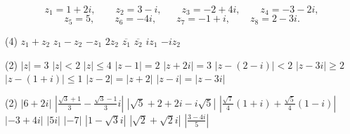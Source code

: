 \documentclass[12pt,a4paper]{article}
\begin{document}
\setcounter{section}{2}

\begin{exercise}
        \[
            z_1=1+2i,\qquad
            z_2=3-i,\qquad
            z_3=-2+4i,\qquad
            z_4=-3-2i,
        \]
        \[
            z_5=5,\qquad
            z_6=-4i,\qquad
            z_7=-1+i,\qquad
            z_8=2-3i.
        \]
\end{exercise}


\begin{exercise}[Pro čísla $z_1=1+2i$ a $z_2=3-i$ nejprve určete algebraicky a poté graficky znázorněte obrazy čísel]
        \begin{tasks}(4)
            \task $z_1+z_2$
            \task $z_1-z_2$
            \task $-z_1$
            \task $2z_2$
            \task $\overline{z_1}$
            \task $\overline{z_2}$
            \task $iz_1$
            \task $-iz_2$
        \end{tasks}
\end{exercise}


\begin{exercise}
        \begin{tasks}(2)
            \task $|z|=3$
            \task $|z|<2$
            \task $|z|\leq4$
            \task $|z-1|=2$
            \task $|z+2i|=3$
            \task $|z-(2-i)|<2$
            \task $|z-3i|\geq2$
            \task $|z-(1+i)|\leq1$
            \task $|z-2|=|z+2|$
            \task $|z-i|=|z-3i|$
        \end{tasks}
\end{exercise}


\begin{exercise}[Vypočítejte]
    \begin{tasks}(2)
        \task $|6+2i|$
        \task $\left|\frac{\sqrt3+1}{3}-\frac{\sqrt3-1}{3}i\right|$
        \task $|\sqrt5+2+2i-i\sqrt5|$
        \task $\left|\frac{\sqrt7}{4}(1+i)+\frac{\sqrt5}{4}(1-i)\right|$
        \task $|-3+4i|$
        \task $|5i|$
        \task $|-7|$
        \task $|1-\sqrt3 i|$
        \task $|\sqrt2+\sqrt2 i|$
        \task $\left|\frac{3-4i}{5}\right|$
    \end{tasks}
\end{exercise}
\end{document}
